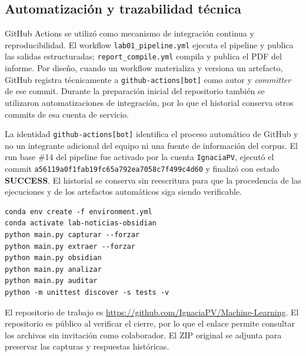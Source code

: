\documentclass[conference]{IEEEtran}
\begin{document}
\subsection{Automatización y trazabilidad técnica}
GitHub Actions se utilizó como mecanismo de integración continua y reproducibilidad. El workflow \texttt{lab01\_pipeline.yml} ejecuta el pipeline y publica las salidas estructuradas; \texttt{report\_compile.yml} compila y publica el PDF del informe. Por diseño, cuando un workflow materializa y versiona un artefacto, GitHub registra técnicamente a \texttt{github-actions[bot]} como autor y \emph{committer} de ese commit. Durante la preparación inicial del repositorio también se utilizaron automatizaciones de integración, por lo que el historial conserva otros commits de esa cuenta de servicio.

La identidad \texttt{github-actions[bot]} identifica el proceso automático de GitHub y no un integrante adicional del equipo ni una fuente de información del corpus. El run base \#14 del pipeline fue activado por la cuenta \texttt{IgnaciaPV}, ejecutó el commit \texttt{a56119a0f1fab19fc65a792ea7058c7f499c4d60} y finalizó con estado \textbf{SUCCESS}. El historial se conserva sin reescritura para que la procedencia de las ejecuciones y de los artefactos automáticos siga siendo verificable.

\begin{lstlisting}[caption={Ejecución del corpus semilla},label={lst:ejecucion}]
conda env create -f environment.yml
conda activate lab-noticias-obsidian
python main.py capturar --forzar
python main.py extraer --forzar
python main.py obsidian
python main.py analizar
python main.py auditar
python -m unittest discover -s tests -v
\end{lstlisting}

El repositorio de trabajo es \url{https://github.com/IgnaciaPV/Machine-Learning}. El repositorio es público al verificar el cierre, por lo que el enlace permite consultar los archivos sin invitación como colaborador. El ZIP original se adjunta para preservar las capturas y respuestas históricas.

\appendices
\end{document}
